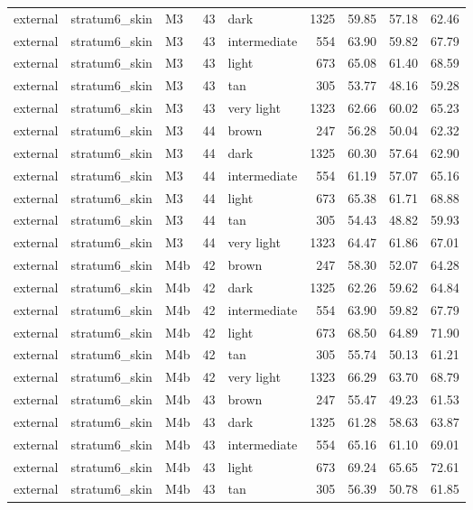 \begin{tabular}{lllrlrrrr}
external & stratum6\_skin & M3 & 43 & dark & 1325 & 59.85 & 57.18 & 62.46 \\
external & stratum6\_skin & M3 & 43 & intermediate & 554 & 63.90 & 59.82 & 67.79 \\
external & stratum6\_skin & M3 & 43 & light & 673 & 65.08 & 61.40 & 68.59 \\
external & stratum6\_skin & M3 & 43 & tan & 305 & 53.77 & 48.16 & 59.28 \\
external & stratum6\_skin & M3 & 43 & very light & 1323 & 62.66 & 60.02 & 65.23 \\
external & stratum6\_skin & M3 & 44 & brown & 247 & 56.28 & 50.04 & 62.32 \\
external & stratum6\_skin & M3 & 44 & dark & 1325 & 60.30 & 57.64 & 62.90 \\
external & stratum6\_skin & M3 & 44 & intermediate & 554 & 61.19 & 57.07 & 65.16 \\
external & stratum6\_skin & M3 & 44 & light & 673 & 65.38 & 61.71 & 68.88 \\
external & stratum6\_skin & M3 & 44 & tan & 305 & 54.43 & 48.82 & 59.93 \\
external & stratum6\_skin & M3 & 44 & very light & 1323 & 64.47 & 61.86 & 67.01 \\
external & stratum6\_skin & M4b & 42 & brown & 247 & 58.30 & 52.07 & 64.28 \\
external & stratum6\_skin & M4b & 42 & dark & 1325 & 62.26 & 59.62 & 64.84 \\
external & stratum6\_skin & M4b & 42 & intermediate & 554 & 63.90 & 59.82 & 67.79 \\
external & stratum6\_skin & M4b & 42 & light & 673 & 68.50 & 64.89 & 71.90 \\
external & stratum6\_skin & M4b & 42 & tan & 305 & 55.74 & 50.13 & 61.21 \\
external & stratum6\_skin & M4b & 42 & very light & 1323 & 66.29 & 63.70 & 68.79 \\
external & stratum6\_skin & M4b & 43 & brown & 247 & 55.47 & 49.23 & 61.53 \\
external & stratum6\_skin & M4b & 43 & dark & 1325 & 61.28 & 58.63 & 63.87 \\
external & stratum6\_skin & M4b & 43 & intermediate & 554 & 65.16 & 61.10 & 69.01 \\
external & stratum6\_skin & M4b & 43 & light & 673 & 69.24 & 65.65 & 72.61 \\
external & stratum6\_skin & M4b & 43 & tan & 305 & 56.39 & 50.78 & 61.85 \\

\end{tabular}
